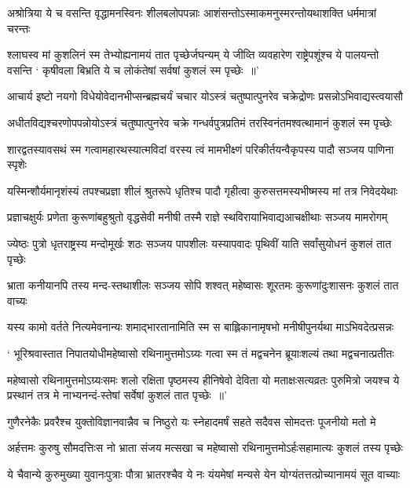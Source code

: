 \twolineshloka
{अश्रोत्रिया ये च वसन्ति वृद्धामनस्विनः शीलबलोपपन्नाः}
{आशंसन्तोऽस्माकमनुस्मरन्तोयथाशक्ति धर्ममात्रां चरन्तः}


\threelineshloka
{श्लाघस्व मां कुशलिनं स्म तेभ्योह्यनामयं तात पृच्छेर्जघन्यम्}
{ये जीव्ति व्यवहारेण राष्ट्रेपशूंश्च ये पालयन्तो वसन्ति}
{` कृषीवला बिभ्रति ये च लोकंतेषां सर्वषां कुशलं स्म पृच्छेः ॥'}


\twolineshloka
{आचार्य इष्टो नयगो विधेयोवेदानभीप्सन्ब्रह्मचर्यं चचार}
{योऽस्त्रं चतुष्पात्पुनरेव चक्रेद्रोणः प्रसन्नोऽभिवाद्यस्त्वयासौ}


\twolineshloka
{अधीतविद्यश्चरणोपपन्नोयोऽस्त्रं चतुष्पात्पुनरेव चक्रे}
{गन्धर्वपुत्रप्रतिमं तरस्विनंतमश्वत्थामानं कुशलं स्म पृच्छेः}


\twolineshloka
{शारद्वतस्यावसथं स्म गत्वामहारथस्यात्मविदां वरस्य}
{त्वं मामभीक्ष्णं परिकीर्तयन्वैकृपस्य पादौ सञ्जय पाणिना स्पृशेः}


\twolineshloka
{यस्मिन्शौर्यमानृशंस्यं तपश्चप्रज्ञा शीलं श्रुतरूपे धृतिश्च}
{पादौ गृहीत्वा कुरुसत्तमस्यभीष्मस्य मां तत्र निवेदयेथाः}


\twolineshloka
{प्रज्ञाचक्षुर्यः प्रणेता कुरूणांबहुश्रुतो वृद्धसेवी मनीषी}
{तस्मै राज्ञे स्थविरायाभिवाद्यआचक्षीथाः सञ्जय मामरोगम्}


\twolineshloka
{ज्येष्ठः पुत्रो धृतराष्ट्रस्य मन्दोमूर्खः शठः सञ्जय पापशीलः}
{यस्यापवादः पृथिवीं याति सर्वांसुयोधनं कुशलं तात पृच्छेः}


\twolineshloka
{भ्राता कनीयानपि तस्य मन्द-स्तथाशीलः सञ्जय सोपि शश्वत्}
{महेष्वासः शूरतमः कुरूणांदुःशासनः कुशलं तात वाच्यः}


\twolineshloka
{यस्य कामो वर्तते नित्यमेवनान्यः शमाद्भारतानामिति स्म}
{स बाह्लिकानामृषभो मनीषीपुनर्यथा माऽभिवदेत्प्रसन्नः}


\twolineshloka
{` भूरिश्रवास्तात निपातयोधीमहेष्वासो रथिनामुत्तमोऽग्र्यः}
{गत्वा स्म तं मद्वचनेन ब्रूयाःशल्यं तथा मद्वचनात्प्रतीतः}


\threelineshloka
{महेष्वासो रथिनामुत्तमोऽग्र्यःसमः शलो रक्षिता पृष्ठमस्य}
{हीनिषेवो देविता यो मताक्षःसत्यव्रतः पुरुमित्रो जयश्च}
{ये प्रस्थानं तत्र मे नाभ्यनन्दं-स्तेषां सर्वेषां कुशलं तात पृच्छेः ॥'}


\twolineshloka
{गुणैरनेकैः प्रवरैश्च युक्तोविज्ञानवान्नैव च निष्ठुरो यः}
{स्नेहादमर्षं सहते सदैवस सोमदत्तः पूजनीयो मतो मे}


\twolineshloka
{अर्हत्तमः कुरुषु सौमदत्तिःस नो भ्राता संजय मत्सखा च}
{महेष्वासो रथिनामुत्तमोऽर्हःसहामात्यः कुशलं तस्य पृच्छेः}


\twolineshloka
{ये चैवान्ये कुरुमुख्या युवानःपुत्राः पौत्रा भ्रातरश्चैव ये नः}
{यंयमेषां मन्यसे येन योग्यंतत्तत्प्रोच्यानामयं सूत वाच्याः}


